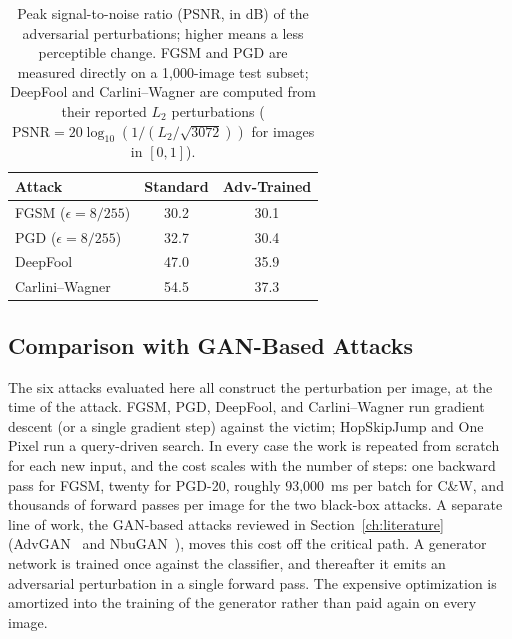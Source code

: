 \begin{table}[htbp]
    \centering
    \caption{Peak signal-to-noise ratio (PSNR, in dB) of the adversarial perturbations; higher means a less perceptible change. FGSM and PGD are measured directly on a 1{,}000-image test subset; DeepFool and Carlini--Wagner are computed from their reported $L_2$ perturbations ($\mathrm{PSNR} = 20 \log_{10}(1 / (L_2 / \sqrt{3072}))$ for images in $[0,1]$).}
    \label{tab:psnr}
    \begin{tabular}{lcc}
        \toprule
        \textbf{Attack} & \textbf{Standard} & \textbf{Adv-Trained} \\
        \midrule
        FGSM ($\epsilon = 8/255$) & 30.2 & 30.1 \\
        PGD ($\epsilon = 8/255$) & 32.7 & 30.4 \\
        DeepFool & 47.0 & 35.9 \\
        Carlini--Wagner & 54.5 & 37.3 \\
        \bottomrule
    \end{tabular}
\end{table}

\subsection{Comparison with GAN-Based Attacks}
\label{sec:gan_comparison}

The six attacks evaluated here all construct the perturbation per image, at the time of the attack. FGSM, PGD, DeepFool, and Carlini--Wagner run gradient descent (or a single gradient step) against the victim; HopSkipJump and One Pixel run a query-driven search. In every case the work is repeated from scratch for each new input, and the cost scales with the number of steps: one backward pass for FGSM, twenty for PGD-20, roughly 93{,}000~ms per batch for C\&W, and thousands of forward passes per image for the two black-box attacks. A separate line of work, the GAN-based attacks reviewed in Section~\ref{ch:literature} (AdvGAN~\cite{xiao2018advgan} and NbuGAN~\cite{topal2026nbugan}), moves this cost off the critical path. A generator network is trained once against the classifier, and thereafter it emits an adversarial perturbation in a single forward pass. The expensive optimization is amortized into the training of the generator rather than paid again on every image.

